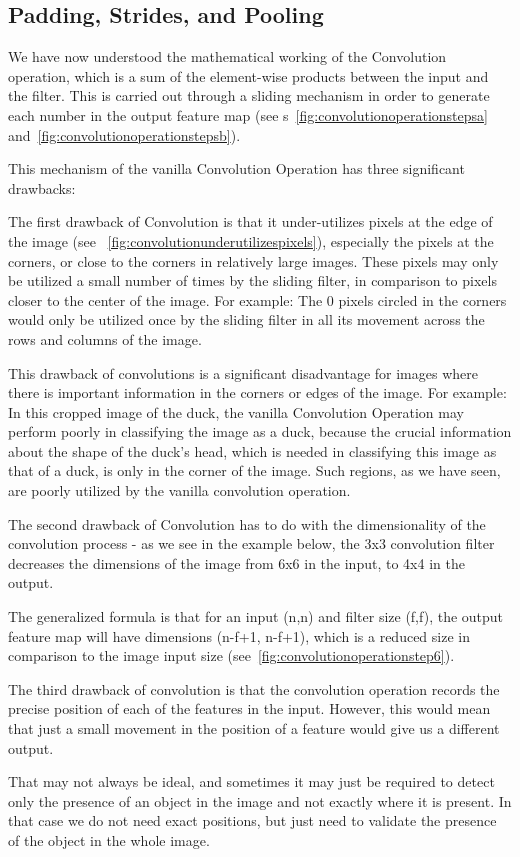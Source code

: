 	\subsection{Padding, Strides, and Pooling}
	\begin{bulletedlist}
		\item We have now understood the mathematical working of the Convolution operation, which is a sum of the element-wise products between the input and the filter. This is carried out through a sliding mechanism in order to generate each number in the output feature map (see \figurename{}s~\ref{fig:convolutionoperationstepsa} and~\ref{fig:convolutionoperationstepsb}).
		\item This mechanism of the vanilla Convolution Operation has three significant drawbacks:
		\item The first drawback of Convolution is that it under-utilizes pixels at the edge of the image (see \figurename~\ref{fig:convolutionunderutilizespixels}), especially the pixels at the corners, or close to the corners in relatively large images.  These pixels may only be utilized a small number of times by the sliding filter, in comparison to pixels closer to the center of the image.  For example: The 0 pixels circled in the corners would only be utilized once by the sliding filter in all its movement across the rows and columns of the image.
		\item This drawback of convolutions is a significant disadvantage for images where there is important information in the corners or edges of the image.  For example: In this cropped image of the duck, the vanilla Convolution Operation may perform poorly in classifying the image as a duck, because the crucial information about the shape of the duck's head, which is needed in classifying this image as that of a duck, is only in the corner of the image. Such regions, as we have seen, are poorly utilized by the vanilla convolution operation.
		\item The second drawback of Convolution has to do with the dimensionality of the convolution process - as we see in the example below, the 3x3 convolution filter decreases the dimensions of the image from 6x6 in the input, to 4x4 in the output.
		\item The generalized formula is that for an input (n,n) and filter size (f,f), the output feature map will have dimensions (n-f+1, n-f+1), which is a reduced size in comparison to the image input size (see~\ref{fig:convolutionoperationstep6}).
		\item The third drawback of convolution is that the convolution operation records the precise position of each of the features in the input. However, this would mean that just a small movement in the position of a feature would give us a different output.
		\item That may not always be ideal, and sometimes it may just be required to detect only the presence of an object in the image and not exactly where it is present.  In that case we do not need exact positions, but just need to validate the presence of the object in the whole image.
	\end{bulletedlist}

